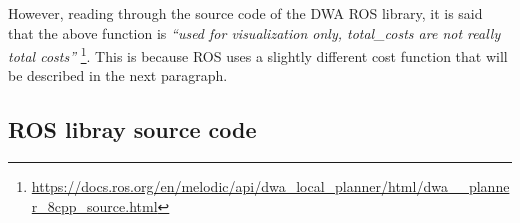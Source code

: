 \documentclass[11pt,a4paper]{article}
\begin{document}
However, reading through the source code of the DWA ROS library, it is said that the above function is
\textit{``used for visualization only, total\_costs are not really total costs''} \footnote{\href{https://docs.ros.org/en/melodic/api/dwa\_local\_planner/html/dwa\_\_planner\_8cpp\_source.html}{https://docs.ros.org/en/melodic/api/dwa\_local\_planner/html/dwa\_\_planner\_8cpp\_source.html}}.
This is because ROS uses a slightly different cost function that will be described in the next paragraph.



\subsection{ROS libray source code}
\end{document}
